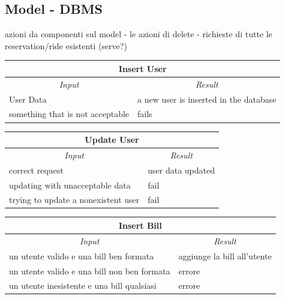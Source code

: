 \documentclass[english]{article}
\begin{document}


\subsection{Model - DBMS}
azioni da componenti sul model
- le azioni di delete
- richieste di tutte le reservation/ride esistenti (serve?)

\begin{center}
	\begin{tabular}{ | m{6cm} | m{6cm} | }
		\hline
		\multicolumn{2}{|c|}{\textbf{Insert User}} \\
		\hline
		\multicolumn{1}{|c|}{\textit{Input}} & \multicolumn{1}{c|}{\textit{Result}} \\
		\hline
		User Data & a new user is inserted in the database \\
		\hline
		something that is not acceptable & fails \\
		\hline
	\end{tabular}
\end{center}
\begin{center}
	\begin{tabular}{ | m{6cm} | m{6cm} | }
		\hline
		\multicolumn{2}{|c|}{\textbf{Update User}} \\
		\hline
		\multicolumn{1}{|c|}{\textit{Input}} & \multicolumn{1}{c|}{\textit{Result}} \\
		\hline
		correct request & user data updated \\
		\hline
		updating with unacceptable data & fail \\
		\hline
		trying to update a nonexistent user & fail \\
		\hline
	\end{tabular}
\end{center}

\begin{center}
	\begin{tabular}{ | m{6cm} | m{6cm} | }
		\hline
		\multicolumn{2}{|c|}{\textbf{Insert Bill}} \\
		\hline
		\multicolumn{1}{|c|}{\textit{Input}} & \multicolumn{1}{c|}{\textit{Result}} \\
		\hline
		un utente valido e una bill ben formata & aggiunge la bill all'utente \\
		\hline
		un utente valido e una bill non ben formata & errore \\
		\hline
		un utente inesistente e una bill qualsiasi & errore \\
		\hline
	\end{tabular}
\end{center}
\end{document}
